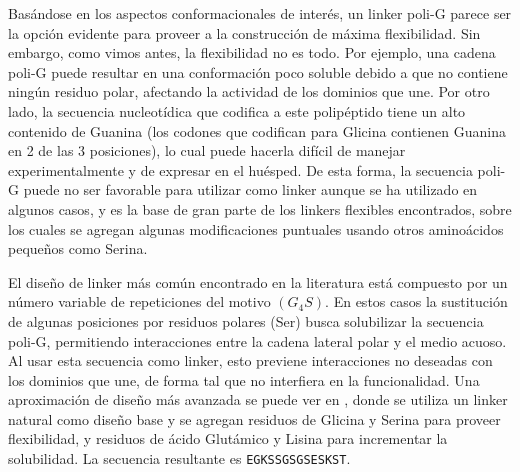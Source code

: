 
Basándose en los aspectos conformacionales de interés, un linker poli-G parece ser la opción evidente para proveer a la construcción de máxima flexibilidad.
Sin embargo, como vimos antes, la flexibilidad no es todo. 
Por ejemplo, una cadena poli-G puede resultar en una conformación poco soluble debido a que no contiene ningún residuo polar, afectando la actividad de los dominios que une\cite{robinson1998optimizing}. 
Por otro lado, la secuencia nucleotídica que codifica a este polipéptido tiene un alto contenido de Guanina (los codones que codifican para Glicina contienen Guanina en 2 de las 3 posiciones), lo cual  
puede hacerla difícil de manejar experimentalmente y de expresar en el huésped\cite{trinh2004optimization}.
De esta forma, la secuencia poli-G puede no ser favorable para utilizar como linker aunque se ha utilizado en algunos casos\cite{iwakura1998effects,de2012characterization,sabourin2007flexible}, 
y es la base de gran parte de los linkers flexibles encontrados, sobre los cuales se agregan algunas modificaciones puntuales usando otros aminoácidos pequeños como Serina.%

El diseño de linker más común encontrado en la literatura está compuesto por un número variable de repeticiones del motivo $(G_4S)$. %
En estos casos la sustitución de algunas posiciones por residuos polares (Ser) busca solubilizar la secuencia poli-G, permitiendo interacciones entre la cadena lateral polar y el medio acuoso. 
Al usar esta secuencia como linker, esto previene interacciones no deseadas con los dominios que une, de forma tal que no interfiera en la funcionalidad.
Una aproximación de diseño más avanzada se puede ver en \cite{bird1988single}, donde se utiliza un linker natural como diseño base y se agregan residuos de Glicina y Serina para proveer flexibilidad, 
y residuos de ácido Glutámico y Lisina para incrementar la solubilidad. La secuencia resultante es \texttt{EGKSSGSGSESKST}.



